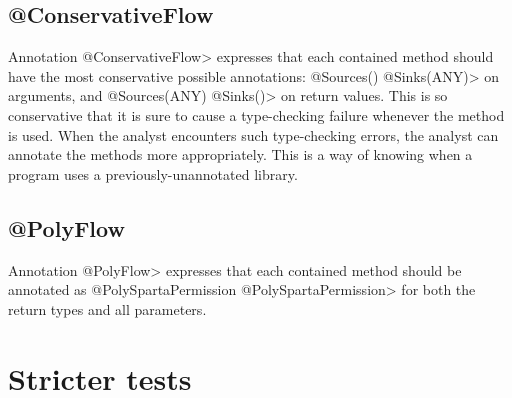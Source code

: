 \subsection{@ConservativeFlow}

Annotation \<@ConservativeFlow> expresses that each contained method
should have the most conservative possible annotations:
  \<@Sources({}) @Sinks(ANY)> on arguments, and
  \<@Sources(ANY) @Sinks({})> on return values.
This is so conservative that it is sure to cause a type-checking failure
whenever the method is used.
When the analyst encounters such type-checking errors, the analyst can
annotate the methods more appropriately.  This is a way of knowing when a
program uses a previously-unannotated library.


\subsection{@PolyFlow\label{sec:polyflow}}

Annotation \<@PolyFlow> expresses that each contained method should be
annotated as \<@PolySpartaPermission @PolySpartaPermission> for both the return
types and all parameters.



%
%
%




\section{Stricter tests\label{sec:stricter}}

